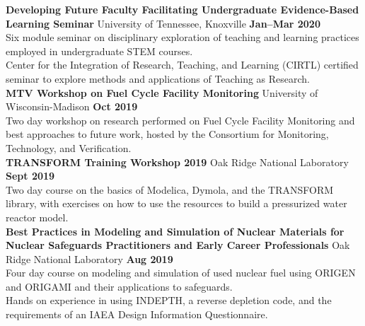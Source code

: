 \documentclass[margin,line]{resume}
\begin{document}
\begin{resume}
    \textbf{Developing Future Faculty Facilitating Undergraduate Evidence-Based Learning Seminar} 
    University of Tennessee, Knoxville \hfill \textbf{Jan--Mar 2020} \\
    Six module seminar on disciplinary exploration of teaching and learning practices employed in undergraduate STEM courses. \\
    Center for the Integration of Research, Teaching, and Learning (CIRTL) certified seminar to explore methods and applications of Teaching as Research.\\
    \textbf{MTV Workshop on Fuel Cycle Facility Monitoring} 
    University of Wisconsin-Madison \hfill \textbf{Oct 2019} \\
    Two day workshop on research performed on Fuel Cycle Facility Monitoring and best approaches to future work, hosted by the Consortium for Monitoring, Technology, and Verification. \\
    \textbf{TRANSFORM Training Workshop 2019} 
    Oak Ridge National Laboratory \hfill \textbf{Sept 2019} \\
    Two day course on the basics of Modelica, Dymola, and the TRANSFORM library, with exercises on how to use the resources to build a pressurized water reactor model. \\
    \textbf{Best Practices in Modeling and Simulation of Nuclear Materials for Nuclear Safeguards Practitioners and Early Career Professionals} 
    Oak Ridge National Laboratory \hfill \textbf{Aug 2019} \\
    Four day course on modeling and simulation of used nuclear fuel using ORIGEN and ORIGAMI and their applications to safeguards. \\
    Hands on experience in using INDEPTH, a reverse depletion code, and the requirements of an IAEA Design Information Questionnaire. 
    





\end{resume}
\end{document}

